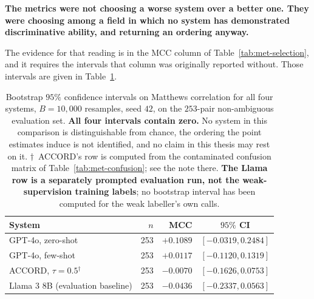 \textbf{The metrics were not choosing a worse system over a better one. They were
choosing among a field in which no system has demonstrated discriminative
ability, and returning an ordering anyway.}

The evidence for that reading is in the MCC column of
Table~\ref{tab:met-selection}, and it requires the intervals that column was
originally reported without. Those intervals are given in
Table~\ref{tab:met-mccci}.

\begin{table}[t]
\centering
\small
\begin{tabular}{lrrc}
\toprule
\textbf{System} & \textbf{$n$} & \textbf{MCC} & \textbf{$95\%$ CI} \\
\midrule
GPT-4o, zero-shot          & 253 & $+0.1089$ & $[-0.0319, 0.2484]$ \\
GPT-4o, few-shot           & 253 & $+0.0117$ & $[-0.1120, 0.1319]$ \\
ACCORD, $\tau = 0.5$$^{\dagger}$ & 253 & $-0.0070$ & $[-0.1626, 0.0753]$ \\
Llama 3 8B (evaluation baseline) & 253 & $-0.0436$ & $[-0.2337, 0.0563]$ \\
\bottomrule
\end{tabular}
\caption{Bootstrap $95\%$ confidence intervals on Matthews correlation for all
four systems, $B = 10{,}000$ resamples, seed $42$, on the $253$-pair
non-ambiguous evaluation set. \textbf{All four intervals contain zero.} No system
in this comparison is distinguishable from chance, the ordering the point
estimates induce is not identified, and no claim in this thesis may rest on it.
$\dagger$~ACCORD's row is computed from the contaminated confusion matrix of
Table~\ref{tab:met-confusion}; see the note there. \textbf{The Llama row is a
separately prompted evaluation run, not the weak-supervision training
labels}; no bootstrap interval has been computed for the weak labeller's own
calls.}
\label{tab:met-mccci}
\end{table}

